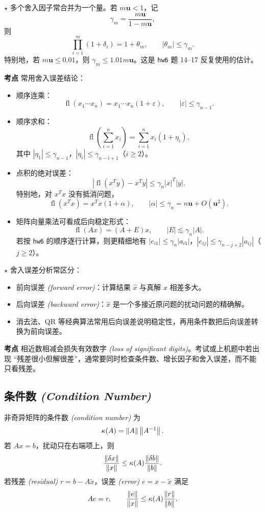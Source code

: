 \documentclass{article}
\newcommand{\fl}{\operatorname{fl}}
\newcommand{\keypoint}{\textcolor{red!65!black}{\textbf{$\star$}}}
\newcommand{\exam}{\textcolor{red!65!black}{\textbf{考点}}}
\newcommand{\eng}[1]{\texorpdfstring{{\normalfont\rmfamily\itshape\textcolor{blue!65!black}{(#1)}}}{(#1)}}
\begin{document}
\keypoint{} 多个舍入因子常合并为一个量。若 $m\mathbf u<1$，记
\[
  \gamma_m=\frac{m\mathbf u}{1-m\mathbf u},
\]
则
\[
  \prod_{i=1}^m(1+\delta_i)=1+\theta_m,\qquad
  |\theta_m|\le\gamma_m.
\]
特别地，若 $m\mathbf u\le0.01$，则 $\gamma_m\le1.01m\mathbf u$。这是
\texttt{hw6} 题 14--17 反复使用的估计。

\exam{} 常用舍入误差结论：
\begin{itemize}
  \item 顺序连乘：
  \[
    \fl(x_1\cdots x_n)=x_1\cdots x_n(1+\varepsilon),\qquad
    |\varepsilon|\le\gamma_{n-1}.
  \]
  \item 顺序求和：
  \[
    \fl\left(\sum_{i=1}^n x_i\right)=\sum_{i=1}^n x_i(1+\eta_i),
  \]
  其中 $|\eta_1|\le\gamma_{n-1}$，$|\eta_i|\le\gamma_{n-i+1}$（$i\ge2$）。
  \item 点积的绝对误差：
  \[
    |\fl(x^Ty)-x^Ty|\le\gamma_n |x|^T|y|.
  \]
  特别地，对 $x^Tx$ 没有抵消问题，
  \[
    \fl(x^Tx)=x^Tx(1+\alpha),\qquad |\alpha|\le\gamma_n=n\mathbf u+O(\mathbf u^2).
  \]
  \item 矩阵向量乘法可看成后向稳定形式：
  \[
    \fl(Ax)=(A+E)x,\qquad |E|\lesssim\gamma_n |A|.
  \]
  若按 \texttt{hw6} 的顺序逐行计算，则更精细地有
  $|e_{i1}|\le\gamma_n|a_{i1}|$，$|e_{ij}|\le\gamma_{n-j+2}|a_{ij}|$（$j\ge2$）。
\end{itemize}

\keypoint{} 舍入误差分析常区分：
\begin{itemize}
  \item 前向误差 \eng{forward error}：计算结果 $\hat x$ 与真解 $x$ 相差多大。
  \item 后向误差 \eng{backward error}：$\hat x$ 是一个多接近原问题的扰动问题的精确解。
  \item 消去法、QR 等经典算法常用后向误差说明稳定性，再用条件数把后向误差转换为前向误差。
\end{itemize}

\exam{} 相近数相减会损失有效数字 \eng{loss of significant digits}。考试或上机题中若出现
“残差很小但解很差”，通常要同时检查条件数、增长因子和舍入误差，而不能只看残差。

\subsection{条件数 \eng{Condition Number}}

非奇异矩阵的条件数 \eng{condition number} 为
\[
  \kappa(A)=\left\| A \right\|\left\| A^{-1} \right\|.
\]
若 $Ax=b$，扰动只在右端项上，则
\[
  \frac{\left\| \delta x \right\|}{\left\| x \right\|}
  \le
  \kappa(A)\frac{\left\| \delta b \right\|}{\left\| b \right\|}.
\]
若残差 \eng{residual} $r=b-A\tilde x$，误差 \eng{error} $e=x-\tilde x$ 满足
\[
  Ae=r,\qquad
  \frac{\left\| e \right\|}{\left\| x \right\|}
  \le
  \kappa(A)\frac{\left\| r \right\|}{\left\| b \right\|}.
\]
\end{document}
